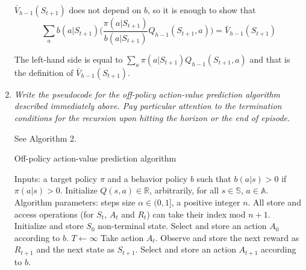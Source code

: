\documentclass[12pt,a4paper]{article}
\begin{document}
\begin{enumerate}
    $\bar{V}_{h - 1}(S_{t + 1})$ does not depend on $b$, so it is enough to show
    that
    \[\sum\limits_a b(a|S_{t + 1}) \Big(\frac{\pi(a | S_{t + 1})}{b(a | S_{t + 1})} Q_{h - 1}(S_{t + 1}, a)\Big) = \bar{V}_{h - 1}(S_{t + 1})
    \]

    The left-hand side is equal to $\sum\limits_a \pi(a | S_{t + 1})Q_{h - 1}(S_{t + 1}, a)$ and that is the definition of $\bar{V}_{h - 1}(S_{t + 1})$.

  \item
    \textit{Write the pseudocode for the off-policy action-value prediction algorithm
    described immediately above. Pay particular attention to the termination
    conditions for the recursion upon hitting the horizon or the end of episode.}

    See Algorithm 2.

    \begin{algorithm}
      \caption{Off-policy action-value prediction algorithm}
      \begin{algorithmic}
        \STATE Inputs: a target policy $\pi$ and a behavior policy $b$ such that
        \STATE $b(a|s) > 0$ if $\pi(a|s) > 0$.
        \STATE Initialize $Q(s, a) \in \mathbb{R}$, arbitrarily, for all
        $s \in \mathbb{S}$, $a \in \mathbb{A}$.
        \STATE Algorithm parameters: steps size $\alpha \in (0, 1]$, a positive
        integer $n$.
        \STATE All store and access operations (for $S_t$, $A_t$ and $R_t$) can take their index mod $n + 1$.
          \STATE Initialize and store $S_0$ non-terminal state.
          \STATE Select and store an action $A_0$ according to $b$.
          \STATE $T \leftarrow \infty$
              \STATE Take action $A_t$.
              \STATE Observe and store the next reward as $R_{t + 1}$ and the
              next state as $S_{t + 1}$.
              \ELSE
                \STATE Select and store an action $A_{t + 1}$ according to $b$.
              \ENDIF
            \ENDIF
              \ELSE
              \ENDIF
              \ENDFOR
            \ENDIF
            \ENDIF
            \ENDFOR
        \ENDFOR
      \end{algorithmic}
    \end{algorithm}


\end{enumerate}
\end{document}
